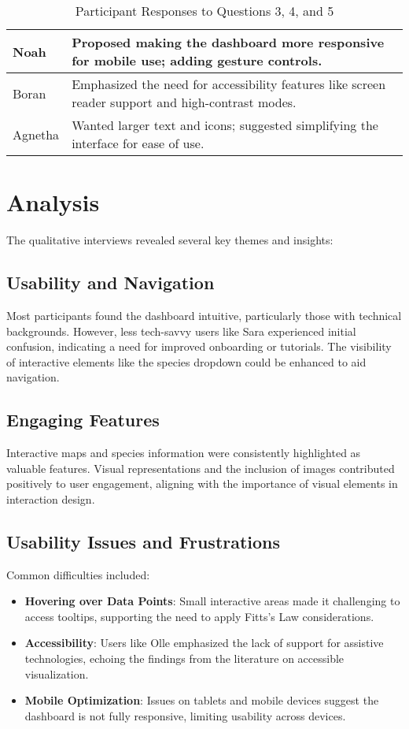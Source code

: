 \begin{table}[H]
\begin{tabular}{p{3cm} | p{12cm}}
        \hline
        Noah & Proposed making the dashboard more responsive for mobile use; adding gesture controls. \\
        \hline
        Boran & Emphasized the need for accessibility features like screen reader support and high-contrast modes. \\
        \hline
        Agnetha & Wanted larger text and icons; suggested simplifying the interface for ease of use. \\
        \hline
    \end{tabular}
    \caption{Participant Responses to Questions 3, 4, and 5}
    \label{tab:responses2}
\end{table}

\section{Analysis}

The qualitative interviews revealed several key themes and insights:

\subsection{Usability and Navigation}

Most participants found the dashboard intuitive, particularly those with technical backgrounds. However, less tech-savvy users like Sara experienced initial confusion, indicating a need for improved onboarding or tutorials. The visibility of interactive elements like the species dropdown could be enhanced to aid navigation.

\subsection{Engaging Features}

Interactive maps and species information were consistently highlighted as valuable features. Visual representations and the inclusion of images contributed positively to user engagement, aligning with the importance of visual elements in interaction design.

\subsection{Usability Issues and Frustrations}

Common difficulties included:

\begin{itemize}
    \item \textbf{Hovering over Data Points}: Small interactive areas made it challenging to access tooltips, supporting the need to apply Fitts's Law considerations.
    \item \textbf{Accessibility}: Users like Olle emphasized the lack of support for assistive technologies, echoing the findings from the literature on accessible visualization.
    \item \textbf{Mobile Optimization}: Issues on tablets and mobile devices suggest the dashboard is not fully responsive, limiting usability across devices.
\end{itemize}


